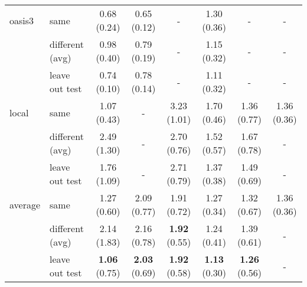 \begin{table*}
\begin{tabular}{llcccccc}
\midrule
oasis3 & same           &  0.68 (0.24) &  0.65 (0.12) &            - &  1.30 (0.36) &            - &            - \\
       & different (avg)    &  0.98 (0.40) &  0.79 (0.19) &            - &  1.15 (0.32) &            - &            - \\
       & leave out test &  0.74 (0.10) &  0.78 (0.14) &            - &  1.11 (0.32) &            - &            - \\
\midrule
local  & same           &  1.07 (0.43) &            - &  3.23 (1.01) &  1.70 (0.46) &  1.36 (0.77) &  1.36 (0.36) \\
       & different (avg)    &  2.49 (1.30) &            - &  2.70 (0.76) &  1.52 (0.57) &  1.67 (0.78) &            - \\
       & leave out test &  1.76 (1.09) &            - &  2.71 (0.79) &  1.37 (0.38) &  1.49 (0.69) &            - \\
\midrule
\midrule
average& same           &  1.27 (0.60) &  2.09 (0.77) &  1.91 (0.72) &  1.27 (0.34) &  1.32 (0.67) &  1.36 (0.36) \\
       & different (avg)    &  2.14 (1.83) &  2.16 (0.78) &  \textbf{1.92} (0.55) &  1.24 (0.41) &  1.39 (0.61) &            - \\
       & leave out test &  \textbf{1.06} (0.75) &  \textbf{2.03} (0.69) &  \textbf{1.92} (0.58) &  \textbf{1.13} (0.30) &  \textbf{1.26} (0.56) &            - \\
\bottomrule
\end{tabular}
\end{table*}
